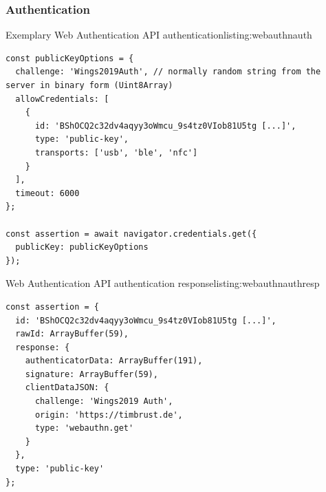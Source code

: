\subsubsection{Authentication}

\begin{example}{Exemplary Web Authentication API authentication}{listing:webauthnauth}
\begin{verbatim}
const publicKeyOptions = {
  challenge: 'Wings2019Auth', // normally random string from the server in binary form (Uint8Array)
  allowCredentials: [
    {
      id: 'BShOCQ2c32dv4aqyy3oWmcu_9s4tz0VIob81U5tg [...]',
      type: 'public-key',
      transports: ['usb', 'ble', 'nfc']
    }
  ],
  timeout: 6000
};

const assertion = await navigator.credentials.get({
  publicKey: publicKeyOptions
});
\end{verbatim}
\end{example}

\begin{example}{Web Authentication API authentication response}{listing:webauthnauthresp}
\begin{verbatim}
const assertion = {
  id: 'BShOCQ2c32dv4aqyy3oWmcu_9s4tz0VIob81U5tg [...]',
  rawId: ArrayBuffer(59),
  response: {
    authenticatorData: ArrayBuffer(191),
    signature: ArrayBuffer(59),
    clientDataJSON: {
      challenge: 'Wings2019 Auth',
      origin: 'https://timbrust.de',
      type: 'webauthn.get'
    }
  },
  type: 'public-key'
};
\end{verbatim}
\end{example}